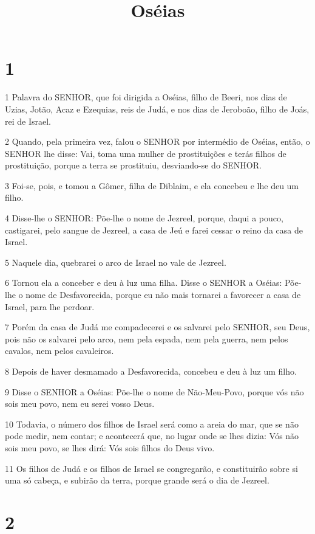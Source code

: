 

\title{Oséias}


\chapter{1}

\par 1 Palavra do SENHOR, que foi dirigida a Oséias, filho de Beeri, nos dias de Uzias, Jotão, Acaz e Ezequias, reis de Judá, e nos dias de Jeroboão, filho de Joás, rei de Israel.
\par 2 Quando, pela primeira vez, falou o SENHOR por intermédio de Oséias, então, o SENHOR lhe disse: Vai, toma uma mulher de prostituições e terás filhos de prostituição, porque a terra se prostituiu, desviando-se do SENHOR.
\par 3 Foi-se, pois, e tomou a Gômer, filha de Diblaim, e ela concebeu e lhe deu um filho.
\par 4 Disse-lhe o SENHOR: Põe-lhe o nome de Jezreel, porque, daqui a pouco, castigarei, pelo sangue de Jezreel, a casa de Jeú e farei cessar o reino da casa de Israel.
\par 5 Naquele dia, quebrarei o arco de Israel no vale de Jezreel.
\par 6 Tornou ela a conceber e deu à luz uma filha. Disse o SENHOR a Oséias: Põe-lhe o nome de Desfavorecida, porque eu não mais tornarei a favorecer a casa de Israel, para lhe perdoar.
\par 7 Porém da casa de Judá me compadecerei e os salvarei pelo SENHOR, seu Deus, pois não os salvarei pelo arco, nem pela espada, nem pela guerra, nem pelos cavalos, nem pelos cavaleiros.
\par 8 Depois de haver desmamado a Desfavorecida, concebeu e deu à luz um filho.
\par 9 Disse o SENHOR a Oséias: Põe-lhe o nome de Não-Meu-Povo, porque vós não sois meu povo, nem eu serei vosso Deus.
\par 10 Todavia, o número dos filhos de Israel será como a areia do mar, que se não pode medir, nem contar; e acontecerá que, no lugar onde se lhes dizia: Vós não sois meu povo, se lhes dirá: Vós sois filhos do Deus vivo.
\par 11 Os filhos de Judá e os filhos de Israel se congregarão, e constituirão sobre si uma só cabeça, e subirão da terra, porque grande será o dia de Jezreel.

\chapter{2}

